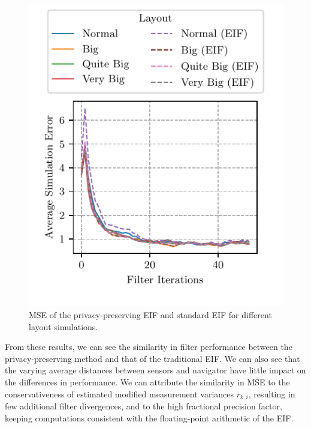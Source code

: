 \documentclass[10pt,letterpaper,oneside,twocolumn,journal]{IEEEtran}
\theoremstyle{definition}
\theoremstyle{definition}
\theoremstyle{remark}
\begin{document}
\begin{figure}[htbp]
    \centering
    \includegraphics{images/layout_errors.pdf}
    \caption{MSE of the privacy-preserving EIF and standard EIF for different layout simulations.}
    \label{fig:sim_layout_errors}
\end{figure}
From these results, we can see the similarity in filter performance between the privacy-preserving method and that of the traditional EIF. We can also see that the varying average distances between sensors and navigator have little impact on the differences in performance. We can attribute the similarity in MSE to the conservativeness of estimated modified measurement variances $r_{k,i}$, resulting in few additional filter divergences, and to the high fractional precision factor, keeping computations consistent with the floating-point arithmetic of the EIF.
\end{document}
